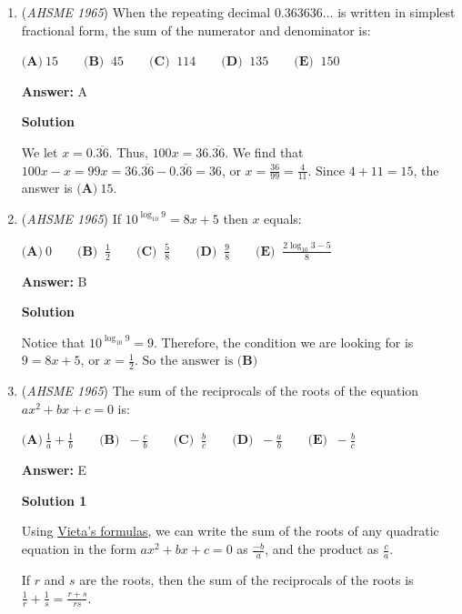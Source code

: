 \begin{enumerate}
 


	\item (\textit{AHSME 1965}) When the repeating decimal $0.363636\ldots$ is written in simplest fractional form, the sum of the numerator and denominator is: 


 $\textbf{(A)}\ 15 \qquad  \textbf{(B) }\ 45 \qquad  \textbf{(C) }\ 114 \qquad  \textbf{(D) }\ 135 \qquad  \textbf{(E) }\ 150$

 \textbf{Answer: }A



\textbf{Solution}

We let $x=0.\overline{36}$. Thus, $100x=36.\overline{36}$. We find that $100x-x=99x=36.\overline{36}-0.\overline{36}=36$, or $x=\frac{36}{99}=\frac{4}{11}$. Since $4+11=15$, the answer is $\boxed{\textbf{(A)}\ 15}$.

 


	\item (\textit{AHSME 1965}) If $10^{\log_{10}9} = 8x + 5$ then $x$ equals: 


 $\textbf{(A)}\ 0 \qquad  \textbf{(B) }\ \frac {1}{2} \qquad  \textbf{(C) }\ \frac {5}{8} \qquad  \textbf{(D) }\ \frac{9}{8}\qquad \textbf{(E) }\ \frac{2\log_{10}3-5}{8}$

 \textbf{Answer: }B



\textbf{Solution}

Notice that $10^{\log_{10} 9} = 9$. Therefore, the condition we are looking for is $9=8x+5$, or $x=\frac{1}{2}$. $\text{So the answer is }  \boxed{\textbf{(B)}}$



	\item (\textit{AHSME 1965}) The sum of the reciprocals of the roots of the equation $ax^2 + bx + c = 0$ is: 


 $\textbf{(A)}\ \frac {1}{a} + \frac {1}{b} \qquad  \textbf{(B) }\ - \frac {c}{b} \qquad  \textbf{(C) }\ \frac{b}{c}\qquad \textbf{(D) }\ -\frac{a}{b}\qquad \textbf{(E) }\ -\frac{b}{c}$

 \textbf{Answer: }E



\textbf{Solution 1}

Using \href{https://artofproblemsolving.com/wiki/index.php?title=Vieta\%27s\_formulas}{Vieta's formulas}, we can write the sum of the roots of any quadratic equation in the form $ax^2+bx+c = 0$ as $\frac{-b}{a}$, and the product as $\frac{c}{a}$.

 If $r$ and $s$ are the roots, then the sum of the reciprocals of the roots is $\frac{1}{r} + \frac{1}{s} = \frac{r+s}{rs}$.


\end{enumerate}
